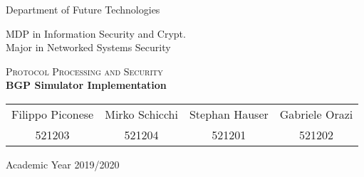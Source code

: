 \pagestyle{plain}

\thispagestyle{empty}

\begin{center}
  \begin{figure}[h!]
    \centerline{}
  \end{figure}


  \LARGE{Department of Future Technologies}

  \vspace{1 cm}
  \Large{MDP in Information Security and Crypt.\\
  Major in Networked Systems Security}

  \vspace{2 cm}
  \vspace{1 cm}
  \Huge\textsc{Protocol Processing and Security\\}
  \vspace{1cm}
  \LARGE{\textbf{BGP Simulator Implementation}\\}


  \vspace{4 cm}
  \begin{tabular}{cccc}
    Filippo Piconese & Mirko Schicchi & Stephan Hauser & Gabriele Orazi\\
    521203 & 521204 & 521201 & 521202\\
  \end{tabular}

  \vfill

  {\Large{Academic Year 2019/2020}}
\end{center}
